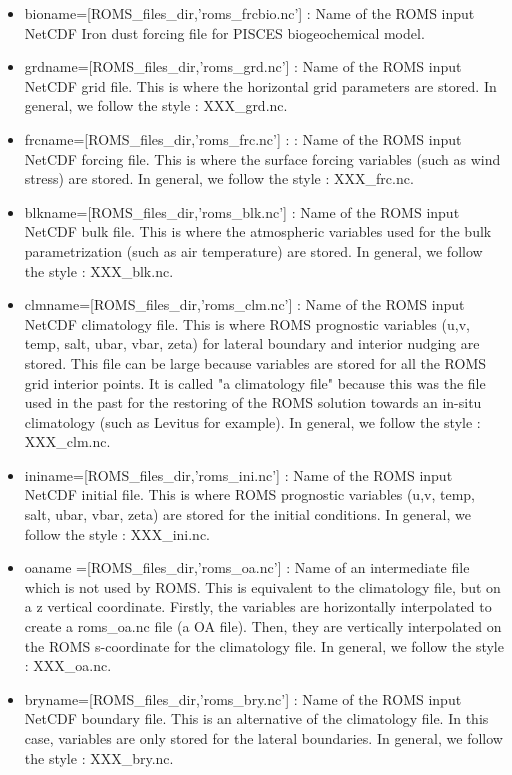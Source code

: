 \begin{itemize}
\item bioname=[ROMS\_files\_dir,'roms\_frcbio.nc'] :  Name of the ROMS input NetCDF Iron dust forcing file for  PISCES biogeochemical model.
\item grdname=[ROMS\_files\_dir,'roms\_grd.nc'] : Name of the ROMS input NetCDF grid file.
This is where the horizontal grid parameters are stored. In general, we follow 
the style : XXX\_grd.nc.
\item frcname=[ROMS\_files\_dir,'roms\_frc.nc'] : : Name of the ROMS input NetCDF forcing file.
This is where the surface forcing variables (such as wind stress) are stored. In general, we 
follow  the style : XXX\_frc.nc.
\item blkname=[ROMS\_files\_dir,'roms\_blk.nc'] : Name of the ROMS input NetCDF bulk file.
This is where the atmospheric variables used for the bulk parametrization (such as air temperature) 
are stored. In general, we follow  the style : XXX\_blk.nc.
\item clmname=[ROMS\_files\_dir,'roms\_clm.nc'] : Name of the ROMS input NetCDF climatology file.
This is where ROMS prognostic variables (u,v, temp, salt, ubar, vbar, zeta) for lateral boundary 
and interior nudging are stored. This file can be large because variables are stored for all the 
ROMS grid interior points. It is called "a climatology file" because this was the file used in 
the past for the restoring of the ROMS solution towards an in-situ climatology (such as Levitus 
for example). In general, we follow the style : XXX\_clm.nc.
\item ininame=[ROMS\_files\_dir,'roms\_ini.nc'] : Name of the ROMS input NetCDF initial file.
This is where ROMS prognostic variables (u,v, temp, salt, ubar, vbar, zeta) are stored 
for the initial conditions. In general, we follow the style : XXX\_ini.nc.
\item oaname =[ROMS\_files\_dir,'roms\_oa.nc'] : Name of an intermediate file which is not
used by ROMS. This is equivalent to the climatology file, but on a z vertical coordinate.
Firstly, the variables are horizontally interpolated to create a roms\_oa.nc file (a OA file). 
Then, they are vertically interpolated on the ROMS s-coordinate for the climatology
file. In general, we follow the style : XXX\_oa.nc.
\item bryname=[ROMS\_files\_dir,'roms\_bry.nc'] : Name of the ROMS input NetCDF boundary file.
This is an alternative of the climatology file. In this case, variables are only stored for 
the lateral boundaries. In general, we follow the style : XXX\_bry.nc.

\end{itemize}
